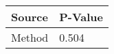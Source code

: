 
\centering
\begin{tabular}{ll}
\toprule
Source & P-Value \\
\midrule
Method &   0.504 \\
\bottomrule
\end{tabular}
